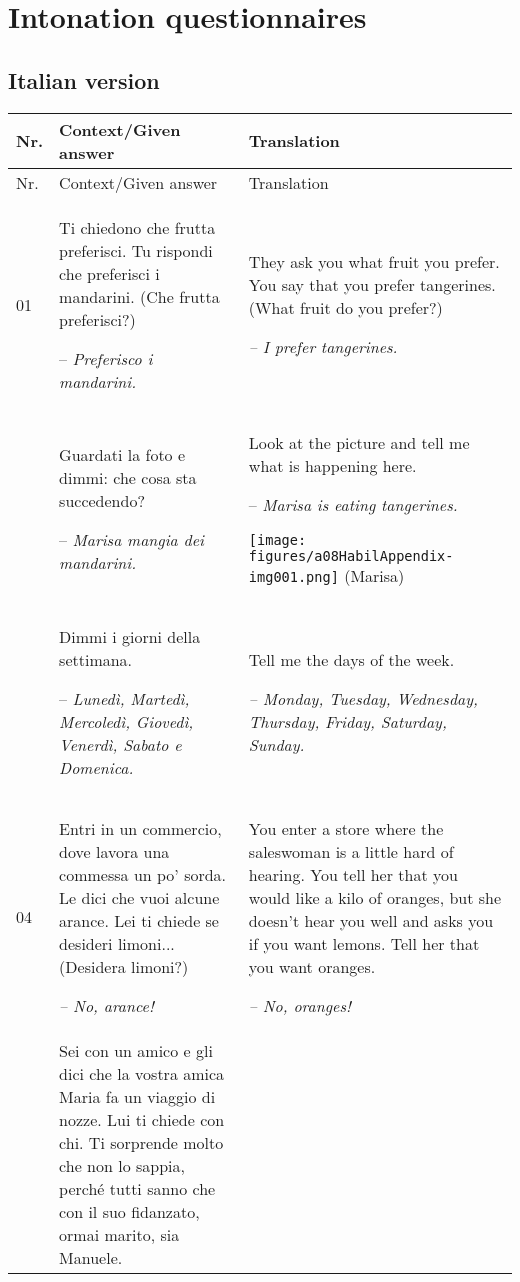 \chapter{Intonation questionnaires}\label{app:a}
\section{Italian version}\label{app:a1}

\begin{xltabular}{\textwidth}{lQQ}
\lsptoprule Nr. & Context\slash Given answer & Translation\\\midrule\endfirsthead
\midrule Nr. & Context\slash Given answer & Translation\\\midrule\endhead
\endfoot\lspbottomrule\endlastfoot

01 & Ti chiedono che frutta preferisci. Tu rispondi che preferisci i mandarini. (Che frutta preferisci?)

-- \textit{Preferisco i mandarini.} & They ask you what fruit you prefer. You say that you prefer tangerines. (What fruit do you prefer?)

{\itshape -- I prefer tangerines.}\\
 & Guardati la foto e dimmi: che cosa sta succedendo?

-- \textit{Marisa mangia dei mandarini.} & Look at the picture and tell me what is happening here.

-- \textit{Marisa is eating tangerines.}

\texttt{[image: figures/a08HabilAppendix-img001.png]}
 (Marisa)\\
 & Dimmi i giorni della settimana.

-- \textit{Lunedì, Martedì, Mercoledì, Giovedì, Venerdì, Sabato e Domenica.} & Tell me the days of the week.

{\itshape -- Monday, Tuesday, Wednesday, Thursday, Friday, Saturday, Sunday.}\\
04 & Entri in un commercio, dove lavora una commessa un po' sorda. Le dici che vuoi alcune arance. Lei ti chiede se desideri limoni... (Desidera limoni?)

{\itshape -- No, arance!} & You enter a store where the saleswoman is a little hard of hearing. You tell her that you would like a kilo of oranges, but she doesn’t hear you well and asks you if you want lemons. Tell her that you want oranges.

{\itshape -- No, oranges!}\\
 & Sei con un amico e gli dici che la vostra amica Maria fa un viaggio di nozze. Lui ti chiede con chi. Ti sorprende molto che non lo sappia, perché tutti sanno che con il suo fidanzato, ormai marito, sia Manuele.


\end{xltabular}
